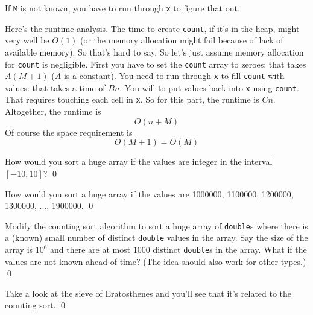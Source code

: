 If \verb!M! is not 
known, you have to run through \verb!x! to figure that out.


Here's the runtime analysis.
The time to create \verb!count!, if it's in the heap,
might very well be $O(1)$ (or the memory allocation might fail because of lack of
available memory). So that's hard to say.
So let's just assume memory allocation for \verb!count! is negligible.
First you have to set the \verb!count! array to zeroes:
that takes $A(M + 1)$ ($A$ is a constant).
You need to run through \verb!x! to fill \verb!count! with
values: that takes a time of $Bn$.
You will to put values back into \verb!x! using \verb!count!.
That requires touching each cell in \verb!x!.
So for this part, the runtime is $Cn$.
Altogether, the runtime is
\[
O(n + M)
\]
Of course the space requirement is
\[
O(M + 1) = O(M)
\]

\newpage

\begin{ex}
  How would you sort a huge array if the values are integer in the interval $[-10, 10]$?
  \qed
\end{ex}


\begin{ex}
  How would you sort a huge array if the values are
  1000000, 1100000, 1200000, 1300000, ..., 1900000.
  \qed
\end{ex}


\begin{ex}
  Modify the counting sort algorithm to sort a huge array of \verb!double!s
  where there is a (known) small number of distinct \verb!double! values in the 
  array.
  Say the size of the array is $10^6$ and there are at most $1000$ distinct
  \verb!double!s in the array.
  What if the values are not known ahead of time?
  (The idea should also work for other types.)
  \qed
\end{ex}


\begin{ex}
Take a look at the sieve of Eratosthenes and you'll see that it's related to 
the counting sort.
\qed
\end{ex}
